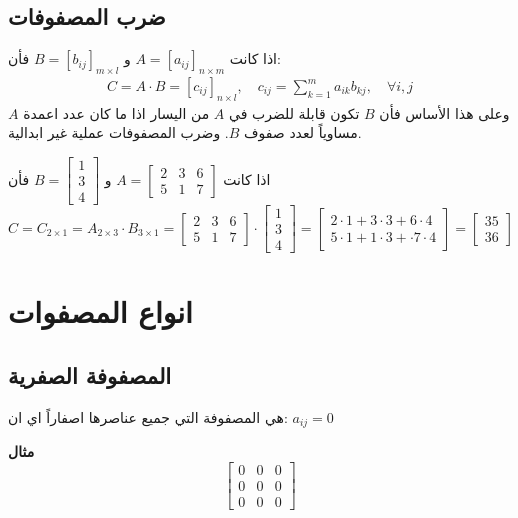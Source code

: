 	\subsection{ضرب المصفوفات}
	اذا كانت 
	$A=[a_{ij}]_{n\times m}$ و $B=[b_{ij}]_{m\times l}$ فأن:
	\begin{align*}
		C= A\cdot B = [c_{ij}]_{n\times l}, \quad c_{ij} = \sum_{k=1}^m a_{ik} b_{kj}, \quad \forall i, j
	\end{align*}
	وعلى هذا الأساس فأن $B$ تكون قابلة للضرب في $A$ من اليسار اذا ما كان عدد اعمدة $A$ مساوياً لعدد صفوف $B$. وضرب المصفوفات عملية غير ابدالية.
	
	\begin{example}
		اذا كانت 
		$A=
		\begin{bmatrix}
			2&3&6\\
			5&1&7
		\end{bmatrix}
		$
		و
		$
		B=
		\begin{bmatrix}
			1\\3\\4
		\end{bmatrix}
		$
		فأن
		\[
		C=C_{2\times 1} = A_{2\times 3}\cdot B_{3\times 1}=\begin{bmatrix}
			2&3&6\\
			5&1&7
		\end{bmatrix}\cdot
		\begin{bmatrix}
			1\\3\\4
		\end{bmatrix}=
		\begin{bmatrix}
			2\cdot1+3\cdot3+6\cdot4\\
			5\cdot1+1\cdot3+\cdot7\cdot4
		\end{bmatrix}=
		\begin{bmatrix}
			35\\
			36
		\end{bmatrix}
		\]
	\end{example}
	
	\section{انواع المصفوات}
	\subsection{المصفوفة الصفرية}
	هي المصفوفة التي جميع عناصرها اصفاراً اي ان:
	$a_{ij} = 0$
	
	\noindent\textbf{مثال}
	\[
	\begin{bmatrix}
		0&0&0\\
		0&0&0\\
		0&0&0
	\end{bmatrix}
	\]
	
